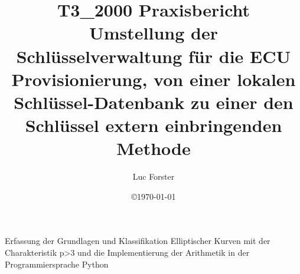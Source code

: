 \documentclass[12pt]{article}		%
\title{T3\_2000 Praxisbericht\\Umstellung der Schlüsselverwaltung für die ECU Provisionierung, von einer lokalen Schlüssel-Datenbank zu einer den Schlüssel extern einbringenden Methode} 	%
\author{Luc Forster}				%
\date{\copyright\today}			%
\begin{document}
\begin{titlepage}
Erfassung der Grundlagen und Klassifikation Elliptischer Kurven mit der Charakteristik p>3 und die Implementierung der Arithmetik in der Programmiersprache Python
\end{titlepage}

\thispagestyle{plain}
\tableofcontents
\end{document}

